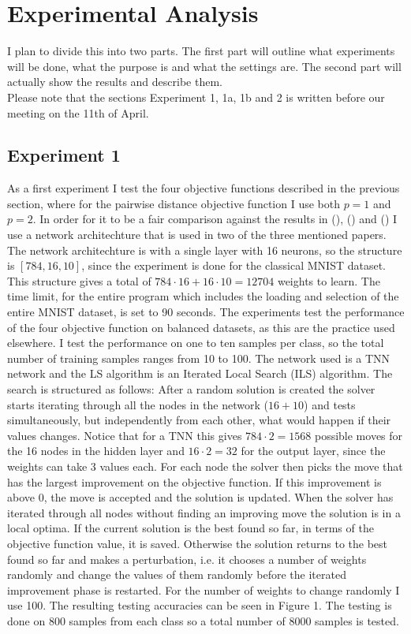 \section{Experimental Analysis}

I plan to divide this into two parts. The first part will outline what experiments will be done, what the purpose is and what the settings are. The second part will actually show the results and describe them. \\

Please note that the sections Experiment 1, 1a, 1b and 2 is written before our meeting on the 11th of April. 

\subsection{Experiment 1}

As a first experiment I test the four objective functions described in the previous section, where for the pairwise distance objective function I use both $p=1$ and $p= 2$. In order for it to be a fair comparison against the results in (\cite{icarte2019}), (\cite{thorbjarnason2023}) and (\cite{ambrogio2023}) I use a network architechture that is used in two of the three mentioned papers. The network architechture is with a single layer with 16 neurons, so the structure is $[784, 16, 10]$, since the experiment is done for the classical MNIST dataset. This structure gives a total of $784 \cdot 16 + 16 \cdot 10 = 12704$ weights to learn. The time limit, for the entire program which includes the loading and selection of the entire MNIST dataset, is set to 90 seconds. The experiments test the performance of the four objective function on balanced datasets, as this are the practice used elsewhere. I test the performance on one to ten samples per class, so the total number of training samples ranges from 10 to 100. The network used is a TNN network and the LS algorithm is an Iterated Local Search (ILS) algorithm. The search is structured as follows: After a random solution is created the solver starts iterating through all the nodes in the network ($16 + 10$) and tests simultaneously, but independently from each other, what would happen if their values changes. Notice that for a TNN this gives $784 \cdot 2 = 1568$ possible moves for the 16 nodes in the hidden layer and $16 \cdot 2 = 32$ for the output layer, since the weights can take 3 values each. For each node the solver then picks the move that has the largest improvement on the objective function. If this improvement is above 0, the move is accepted and the solution is updated. When the solver has iterated through all nodes without finding an improving move the solution is in a local optima. If the current solution is the best found so far, in terms of the objective function value, it is saved. Otherwise the solution returns to the best found so far and makes a perturbation, i.e. it chooses a number of weights randomly and change the values of them randomly before the iterated improvement phase is restarted. For the number of weights to change randomly I use 100. The resulting testing accuracies can be seen in Figure 1. The testing is done on 800 samples from each class so a total number of 8000 samples is tested. \\

